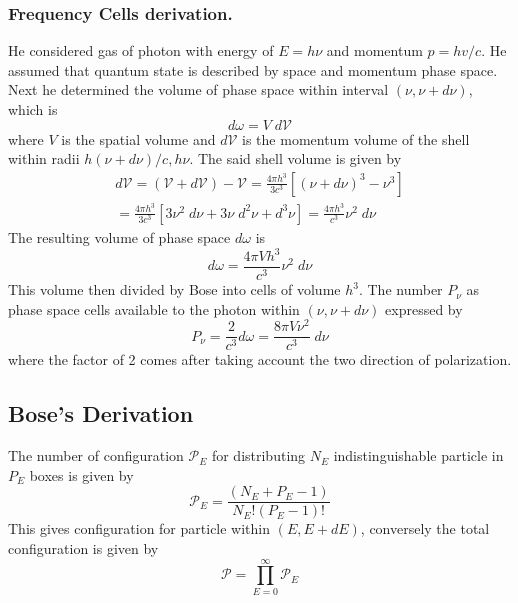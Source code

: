 \documentclass[../../../Main.tex]{subfiles}
\begin{document}
\subsubsection{Frequency Cells derivation.} He considered gas of photon with energy of $E=h\nu$ and momentum $p=hv/c$. He assumed that quantum state is described by space and momentum phase space. Next he determined the volume of phase space within interval $(\nu,\nu+d\nu)$, which is
\begin{equation*}
    d\omega=V\;d\mathcal{V}
\end{equation*}
where $V$ is the spatial volume and $d\mathcal{V}$ is the momentum volume of the shell within radii $h(\nu+d\nu)/c,h\nu$. The said shell volume is given by
\begin{multline*}
    d\mathcal{V}=(\mathcal{V}+d\mathcal{V})-\mathcal{V}=\frac{4\pi h^3}{3c^3}\left[(\nu+d\nu)^3-\nu^3\right] \\= \frac{4\pi h^3}{3c^3}\left[3\nu^2\;d\nu+3\nu\;d^2\nu+d^3\nu\right]=\frac{4\pi h^3}{c^3}\nu^2\;d\nu
\end{multline*}
The resulting volume of phase space $d\omega$ is
\begin{equation*}
    d\omega=\frac{4\pi V h^3}{c^3}\nu^2\;d\nu
\end{equation*}
This volume then divided by Bose into cells of volume $h^3$. The number $P_\nu$ as phase space cells available to the photon within $(\nu,\nu+d\nu)$ expressed by
\begin{equation*}
    P_\nu=\frac{2}{c^3}d\omega=\frac{8\pi V\nu^2}{c^3}\;d\nu
\end{equation*}
where the factor of 2 comes after taking account the two direction of polarization. 

\subsection{Bose's Derivation}

The number of configuration $\mathcal{P}_E$ for distributing $N_E$ indistinguishable particle in $P_E$ boxes is given by 
\begin{equation*}
    \mathcal{P}_E=\frac{(N_E+P_E-1)}{N_E! (P_E-1)!}
\end{equation*}
This gives configuration for particle within $(E,E+dE)$, conversely the total configuration is given by 
\begin{equation*}
    \mathcal{P}=\prod_{E=0}^{\infty}\mathcal{P}_E
\end{equation*}
\end{document}

